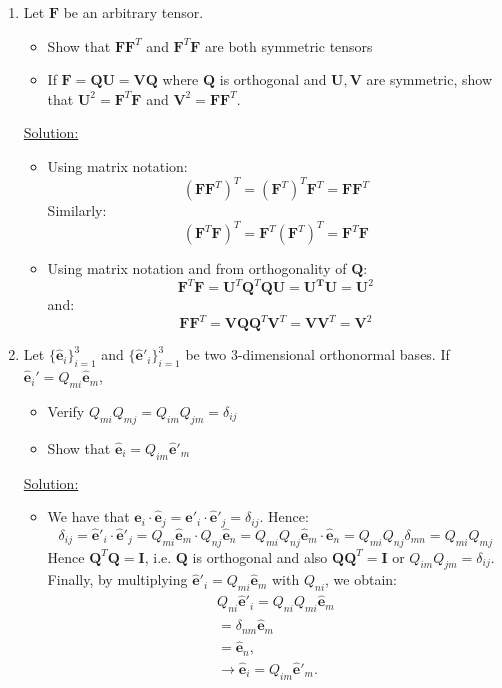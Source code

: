 \documentclass{article}
\newcommand{\ee}{\end{equation}}
\newcommand{\be}{\begin{equation}}
\newcommand{\bi}{\begin{itemize}}
\newcommand{\ei}{\end{itemize}}
\newcommand{\bs}{\boldsymbol}
\begin{document}
\begin{enumerate}
\newpage
\item  Let $\bs{F}$ be an arbitrary tensor.
\bi
\item Show that $\bs{F}\bs{F}^T$ and $\bs{F}^T\bs{F}$ are both symmetric tensors
\item  If $\bs{F}=\bs{QU}=\bs{VQ}$ where $\bs{Q}$ is orthogonal and $\bs{U,V}$ are symmetric, show that $\bs{U}^2=\bs{F}^T\bs{F}$ and $\bs{V}^2=\bs{F}\bs{F}^T$.
\ei

\underline{Solution:}
\bi
\item Using matrix notation:
\be 
\left(\bs{F}\bs{F}^T\right)^T = (\bs{F}^T)^T \bs{F}^T = \bs{F}\bs{F}^T
\ee
Similarly:
\be
\left(\bs{F}^T\bs{F}\right)^T = \bs{F}^T(\bs{F}^T)^T=\bs{F}^T\bs{F}
\ee

\item Using matrix notation and from orthogonality of $\bs{Q}$:
\be
\bs{F}^T\bs{F} = \bs{U}^T \bs{Q}^T\bs{Q} \bs{U} = \bs{U^T} \bs{U} = \bs{U}^2
\ee
and:
\be 
\bs{F}\bs{F}^T = \bs{V}\bs{Q}\bs{Q}^T\bs{V}^T = \bs{V}\bs{V}^T = \bs{V}^2
\ee
\ei


\item  Let $\{\bs{\hat{e}}_i\}_{i = 1}^3$  and $\{\bs{\hat{e}}'_i\}_{i = 1}^3$ be two 3-dimensional orthonormal
bases. If $\bs{\hat{e}}_i' = Q_{mi}\bs{\hat{e}}_m$,
\bi
\item  Verify $Q_{mi}Q_{mj}=Q_{im}Q_{jm}=\delta_{ij}$
\item  Show that $\bs{\hat{e}}_i=Q_{im}\bs{\hat{e}}'_m$
\ei

\underline{Solution:}

\bi
\item We have that $\bs{\hat{e}}_i \cdot \bs{\hat{e}}_j=\bs{\hat{e}}'_i \cdot \bs{\hat{e}}'_j=\delta_{ij}$. 
Hence:
\be
\delta_{ij}=\bs{\hat{e}}'_i \cdot \bs{\hat{e}}'_j=Q_{mi}\bs{\hat{e}}_m \cdot Q_{nj}\bs{\hat{e}}_n=Q_{mi}Q_{nj} \bs{\hat{e}}_m \cdot \bs{\hat{e}}_n =
Q_{mi}Q_{nj}\delta_{mn}=Q_{mi}Q_{mj}
\ee
Hence $\bs{Q}^T\bs{Q}=\bs{I}$, i.e. $\bs{Q}$ is orthogonal and also $\bs{Q}\bs{Q}^T=\bs{I}$ or $Q_{im}Q_{jm}=\delta_{ij}$.
Finally, by multiplying $\bs{\hat{e}}'_i=Q_{mi}\bs{\hat{e}}_m$ with $Q_{ni}$, we obtain:
\be
\begin{array}{l}
Q_{ni} \bs{\hat{e}}'_i=Q_{ni} Q_{mi}\bs{\hat{e}}_m \\
=\delta_{nm} \bs{\hat{e}}_m \\
=\bs{\hat{e}}_n, \\
\to \bs{\hat{e}}_i=Q_{im} \bs{\hat{e}}'_m.
\end{array}
\ee

\ei

\end{enumerate}
\end{document}
